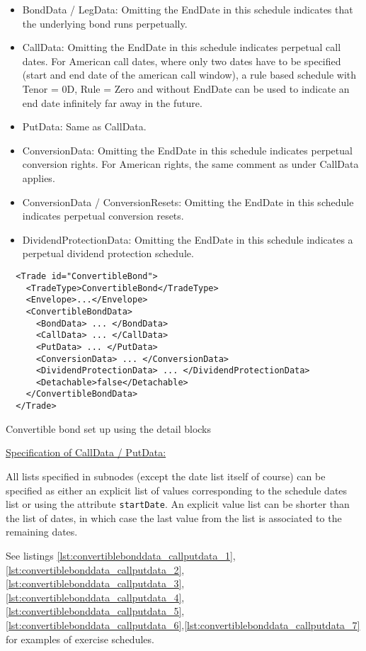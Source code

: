 \begin{itemize}
\item BondData / LegData: Omitting the EndDate in this schedule indicates that the underlying bond runs perpetually.
\item CallData: Omitting the EndDate in this schedule indicates perpetual call dates. For American call dates, where
  only two dates have to be specified (start and end date of the american call window), a rule based schedule with Tenor
  = 0D, Rule = Zero and without EndDate can be used to indicate an end date infinitely far away in the future.
\item PutData: Same as CallData.
\item ConversionData: Omitting the EndDate in this schedule indicates perpetual conversion rights. For American rights,
  the same comment as under CallData applies.
\item ConversionData / ConversionResets: Omitting the EndDate in this schedule indicates perpetual conversion resets.
\item DividendProtectionData: Omitting the EndDate in this schedule indicates a perpetual dividend protection schedule.
\end{itemize}

\begin{listing}[H]
\begin{verbatim}
  <Trade id="ConvertibleBond">
    <TradeType>ConvertibleBond</TradeType>
    <Envelope>...</Envelope>
    <ConvertibleBondData>
      <BondData> ... </BondData>
      <CallData> ... </CallData>
      <PutData> ... </PutData>
      <ConversionData> ... </ConversionData>
      <DividendProtectionData> ... </DividendProtectionData>
      <Detachable>false</Detachable>
    </ConvertibleBondData>
  </Trade>
\end{verbatim}
\caption{Convertible bond set up using the detail blocks}
\label{lst:convertiblebonddata2}
\end{listing}

\underline{Specification of CallData / PutData:}

All lists specified in subnodes (except the date list itself of course) can be specified as either an explicit list of
values corresponding to the schedule dates list or using the attribute \verb+startDate+. An explicit value list can be
shorter than the list of dates, in which case the last value from the list is associated to the remaining dates.

See listings
\ref{lst:convertiblebonddata_callputdata_1},\ref{lst:convertiblebonddata_callputdata_2},\ref{lst:convertiblebonddata_callputdata_3},\ref{lst:convertiblebonddata_callputdata_4},\ref{lst:convertiblebonddata_callputdata_5},\ref{lst:convertiblebonddata_callputdata_6},\ref{lst:convertiblebonddata_callputdata_7}
for examples of exercise schedules.

